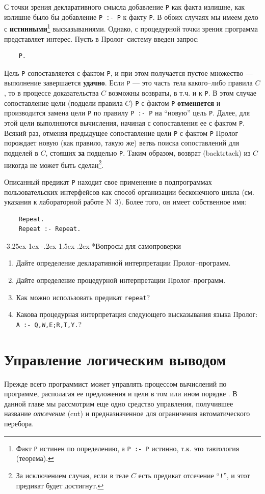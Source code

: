 \documentclass[12pt, openany, twoside]{book} %
\makeatletter
\renewcommand\subsubsection{\@startsection{subsubsection}{3}{\z@}%
                                     {-3.25ex\@plus -1ex \@minus -.2ex}%
                                     {1.5ex \@plus .2ex}%
                                     {\normalfont\normalsize\bfseries}}
\newenvironment{questions}{\subsubsection*{Вопросы для самопроверки}\begin{enumerate}}{\end{enumerate}}
\makeatother
\begin{document}
\noindent С точки зрения декларативного смысла добавление {\tt P} как факта излишне, как излишне было бы добавление {\tt P~:-~P} к факту {\tt P}. В обоих случаях мы имеем дело с {\bf истинными}\footnote{Факт {\tt P} истинен по определению, а {\tt P~:-~P} истинно, т.к. это тавтология (теорема).} высказываниями. Однако, с процедурной точки зрения программа представляет интерес. Пусть в Пролог--систему введен запрос:
{\tt\begin{verbatim}
    P.
\end{verbatim}}
\noindent Цель {\tt P} сопоставляется с фактом {\tt P}, и при этом получается пустое множество --- выполнение завершается {\bf удачно}. Если {\tt P} --- это часть тела какого--либо правила $C$, то в процессе доказательства $C$ возможны возвраты, в т.ч. и к {\tt P}. В этом случае сопоставление цели (подцели правила $C$) {\tt P} с фактом {\tt P} {\bf отменяется} и производится замена цели {\tt P} по правилу {\tt P~:-~P} на ``новую'' цель {\tt P}. Далее, для этой цели выполняются вычисления, начиная с сопоставления ее с фактом {\tt P}. Всякий раз, отменяя предыдущее сопоставление цели {\tt P} с фактом {\tt P} Пролог порождает новую (как правило, такую же) ветвь поиска сопоставлений для подцелей в $C$, стоящих {\bf за} подцелью {\tt P}. Таким образом, возврат (backtrtack) из $C$ никогда не может быть сделан\footnote{За исключением случая, если в теле $C$ есть предикат отсечение ``{\tt !}'', и этот предикат будет достигнут.}.

Описанный предикат {\tt P} находит свое применение в подпрограммах пользовательских интерфейсов как способ организации бесконечного цикла (см. указания к лабораторной работе N~3). Более того, он имеет собственное имя:
{\tt\begin{verbatim}
    Repeat.
    Repeat :- Repeat.
\end{verbatim}}

\begin{questions}
  \item{} Дайте определение декларативной интерпретации Пролог--про\-грамм.
  \item{} Дайте определение процедурной интерпретации Пролог--про\-грамм.
  \item{} Как можно использовать предикат \texttt{repeat}?
  \item{} Какова процедурная интерпретация следующего высказывания языка Пролог: \texttt{A :- Q,W,E;R,T,Y.}?
\end{questions}


\chapter{Управление логическим выводом}
Прежде всего программист может управлять процессом вычислений по программе, располагая ее предложения и цели в том или ином порядке \cite{Bratko}. В данной главе мы рассмотрим еще одно средство управления, получившее название {\em отсечение} (cut) и предназначенное для ограничения автоматического перебора.
\end{document}
